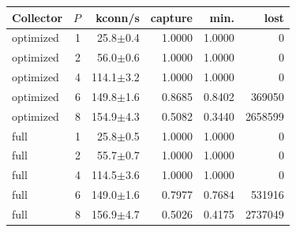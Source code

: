 \begin{tabular*}{\columnwidth}{@{\extracolsep{\fill}}lrrrrr@{}}
\toprule
Collector & $P$ & kconn/s & capture & min. & lost \\
\midrule
optimized & 1 & 25.8$\pm$0.4 & 1.0000 & 1.0000 & 0 \\
optimized & 2 & 56.0$\pm$0.6 & 1.0000 & 1.0000 & 0 \\
optimized & 4 & 114.1$\pm$3.2 & 1.0000 & 1.0000 & 0 \\
optimized & 6 & 149.8$\pm$1.6 & 0.8685 & 0.8402 & 369050 \\
optimized & 8 & 154.9$\pm$4.3 & 0.5082 & 0.3440 & 2658599 \\
full & 1 & 25.8$\pm$0.5 & 1.0000 & 1.0000 & 0 \\
full & 2 & 55.7$\pm$0.7 & 1.0000 & 1.0000 & 0 \\
full & 4 & 114.5$\pm$3.6 & 1.0000 & 1.0000 & 0 \\
full & 6 & 149.0$\pm$1.6 & 0.7977 & 0.7684 & 531916 \\
full & 8 & 156.9$\pm$4.7 & 0.5026 & 0.4175 & 2737049 \\
\bottomrule
\end{tabular*}
